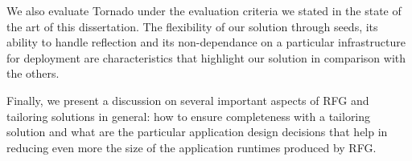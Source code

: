 We also evaluate Tornado under the evaluation criteria we stated in the state of the art of this dissertation. The flexibility of our solution through seeds, its ability to handle reflection and its non-dependance on a particular infrastructure for deployment are characteristics that highlight our solution in comparison with the others.

Finally, we present a discussion on several important aspects of RFG and tailoring solutions in general: how to ensure completeness with a tailoring solution and what are the particular application design decisions that help in reducing even more the size of the application runtimes produced by RFG.


